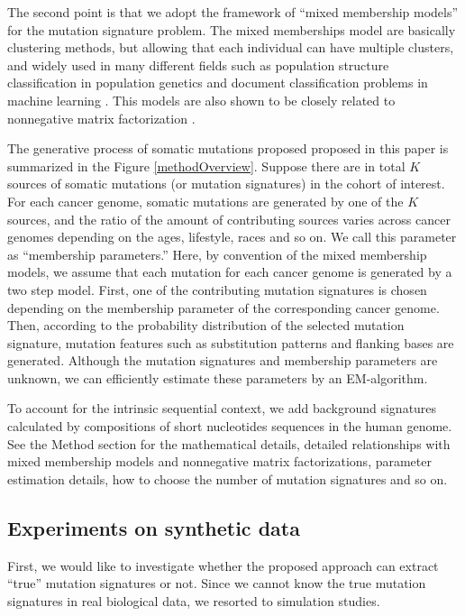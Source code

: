 The second point is that we adopt the framework of ``mixed membership models'' for the mutation signature problem.
The mixed memberships model are basically clustering methods, but allowing that each individual can have multiple clusters,
and widely used in many different fields such as population structure classification in population genetics \cite{pmid10835412} and document classification problems in machine learning \cite{Blei:2003}.
This models are also shown to be closely related to nonnegative matrix factorization \cite{ding2008equivalence}.

The generative process of somatic mutations proposed proposed in this paper is summarized in the Figure \ref{methodOverview}.
Suppose there are in total $K$ sources of somatic mutations (or mutation signatures) in the cohort of interest.
For each cancer genome, somatic mutations are generated by one of the $K$ sources,
and the ratio of the amount of contributing sources varies across cancer genomes depending on the ages, lifestyle, races and so on.
We call this parameter as ``membership parameters.''
Here, by convention of the mixed membership models, we assume that each mutation for each cancer genome is generated by a two step model.
First, one of the contributing mutation signatures is chosen depending on the membership parameter of the corresponding cancer genome.
Then, according to the probability distribution of the selected mutation signature, 
mutation features such as substitution patterns and flanking bases are generated.
Although the mutation signatures and membership parameters are unknown,
we can efficiently estimate these parameters by an EM-algorithm.


To account for the intrinsic sequential context, we add background signatures calculated by compositions of short nucleotides sequences in the human genome.
See the Method section for the mathematical details, 
detailed relationships with mixed membership models and nonnegative matrix factorizations, parameter estimation details, how to choose the number of mutation signatures and so on.


\subsection*{Experiments on synthetic data}

First, we would like to investigate whether the proposed approach can extract ``true'' mutation signatures or not.
Since we cannot know the true mutation signatures in real biological data, we resorted to simulation studies.


